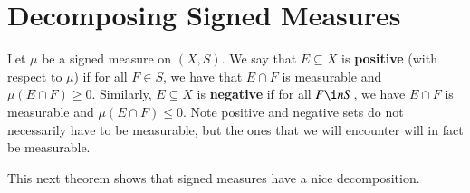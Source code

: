 \documentclass[a4paper,12pt]{report}
\newcommand{\sse} {\subseteq}
\newenvironment{definition}[1][Definition.]{\begin{trivlist}
\item[\hskip \labelsep {\bfseries #1}]}{\end{trivlist}}
\begin{document}
	\section{Decomposing Signed Measures}
	
	\begin{definition}
	Let $\mu$ be a signed measure on $(X, S)$. We say that $E \sse X$ is \textbf{positive} (with respect to $\mu$) if for all $F \in S$, we have that $E \cap F$ is measurable and $\mu(E \cap F) \geq 0$. Similarly, $E \sse X$ is \textbf{negative} if for all $F \i nS$, we have $E \cap F$ is measurable and $\mu(E \cap F) \leq 0$. Note positive and negative sets do not necessarily have to be measurable, but the ones that we will encounter will in fact be measurable.
	\end{definition}
	
	\noindent This next theorem shows that signed measures have a nice decomposition.	
	
\end{document}

